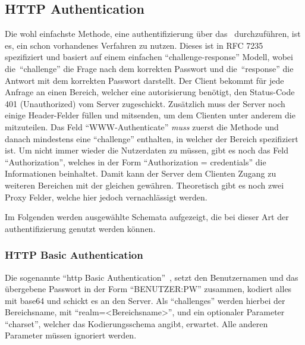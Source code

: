 \subsection{HTTP Authentication}\label{subsec:http-authentication}
	Die wohl einfachste Methode,
	eine \gls{authentifizierung} über das~ durchzuführen,
	ist es,
	ein schon vorhandenes Verfahren zu nutzen.
	Dieses ist in RFC 7235~\cite[Vgl.][]{rfc7235} spezifiziert und
	basiert auf einem einfachen \enquote{challenge-response} Modell,
	wobei die~\enquote{challenge} die Frage nach dem korrekten Passwort und
	die~\enquote{response} die Antwort mit dem korrekten Passwort darstellt.
	Der Client bekommt für jede Anfrage an einen Bereich,
	welcher eine \gls{autorisierung} benötigt,
	den Status-Code 401 (Unauthorized) vom Server zugeschickt.
	Zusätzlich muss der Server noch einige Header-Felder füllen und mitsenden,
	um dem Clienten unter anderem die
	 mitzuteilen.
	Das Feld \enquote{WWW-Authenticate} \textit{muss} zuerst die Methode
	und danach mindestens eine \enquote{challenge} enthalten,
	in welcher der Bereich spezifiziert ist.
	Um nicht immer wieder die Nutzerdaten
	 zu müssen,
	gibt es noch das Feld \enquote{Authorization},
	welches in der Form \enquote{Authorization = credentials} die Informationen beinhaltet.
	Damit kann der Server dem Clienten Zugang zu weiteren Bereichen
	mit der gleichen  gewähren.
	Theoretisch gibt es noch zwei Proxy Felder,
	welche hier jedoch vernachlässigt werden.

	Im Folgenden werden ausgewählte Schemata aufgezeigt,
	die bei dieser Art der \gls{authentifizierung} genutzt werden können.

	\subsubsection{HTTP Basic Authentication}\label{subsubsec:http-basic-authentication}
		Die sogenannte \enquote{\gls{http} Basic Authentication}~\cite[Vgl.][]{rfc7617},
		setzt den Benutzernamen und das übergebene Passwort in der Form \enquote{BENUTZER:PW} zusammen,
		kodiert alles mit \gls{base64} und schickt es an den Server.
		Als \enquote{challenges} werden hierbei der Bereichsname,
		mit \enquote{realm=<Bereichsname>},
		und ein optionaler Parameter \enquote{charset},
		welcher das Kodierungsschema angibt,
		erwartet.
		Alle anderen Parameter müssen ignoriert werden.

